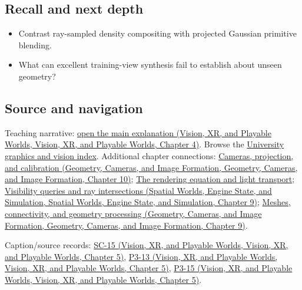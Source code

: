 \subsection{Recall and next depth}\label{appendix-c5b332e400e7-recall-and-next-depth}

\begin{itemize}
\tightlist
\item
  Contrast ray-sampled density compositing with projected Gaussian primitive blending.
\item
  What can excellent training-view synthesis fail to establish about unseen geometry?
\end{itemize}

\subsection{Source and navigation}\label{appendix-c5b332e400e7-source-and-navigation}

Teaching narrative: \href{../07-Vision-XR-and-Playable-Worlds/main.pdf\#nameddest=04-visual-computing-ii-ch034-learned-representations-of-3d-shape-and-scenes}{open the main explanation (Vision, XR, and Playable Worlds, Vision, XR, and Playable Worlds, Chapter 4)}. Browse the \hyperref[appendix-a6d556a4ef50-university-graphics-vision-and-photography---independent-series]{University graphics and vision index}. Additional chapter connections: \href{../03-Geometry-Cameras-and-Image-Formation/main.pdf\#nameddest=03-visual-computing-i-ch003-cameras-projection-and-calibration}{Cameras, projection, and calibration (Geometry, Cameras, and Image Formation, Geometry, Cameras, and Image Formation, Chapter 10)}; \hyperref[03-visual-computing-i-ch007-the-rendering-equation-and-light-transport]{The rendering equation and light transport}; \href{../05-Spatial-Worlds-Engine-State-and-Simulation/main.pdf\#nameddest=04-visual-computing-ii-ch028-visibility-queries-and-ray-intersections-1}{Visibility queries and ray intersections (Spatial Worlds, Engine State, and Simulation, Spatial Worlds, Engine State, and Simulation, Chapter 9)}; \href{../03-Geometry-Cameras-and-Image-Formation/main.pdf\#nameddest=03-visual-computing-i-ch002-meshes-connectivity-and-geometry-processing}{Meshes, connectivity, and geometry processing (Geometry, Cameras, and Image Formation, Geometry, Cameras, and Image Formation, Chapter 9)}.

Caption/source records: \href{../07-Vision-XR-and-Playable-Worlds/main.pdf\#nameddest=04-visual-computing-ii-ch036-sc-15---stanford-cs231n-deep-learning-for-computer-vision-spring-2025-lecture-15-3d-vision}{SC-15 (Vision, XR, and Playable Worlds, Vision, XR, and Playable Worlds, Chapter 5)}, \href{../07-Vision-XR-and-Playable-Worlds/main.pdf\#nameddest=04-visual-computing-ii-ch036-p3-13---curves-and-surfaces}{P3-13 (Vision, XR, and Playable Worlds, Vision, XR, and Playable Worlds, Chapter 5)}, \href{../07-Vision-XR-and-Playable-Worlds/main.pdf\#nameddest=04-visual-computing-ii-ch036-p3-15---ray-tracing}{P3-15 (Vision, XR, and Playable Worlds, Vision, XR, and Playable Worlds, Chapter 5)}.
